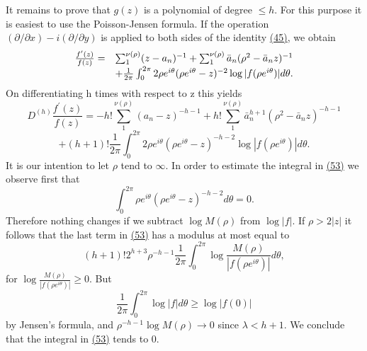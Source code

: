 It remains to prove that $g(z)$ is a polynomial of degree $\leq h$. For this purpose it is easiest to use the Poisson-Jensen formula. If the operation $(\partial/\partial x) - i(\partial/\partial y)$ is applied to both sides of the identity \hyperref[eq:5.45]{(45)}, we obtain
\begin{equation*}
\begin{array}{r l} \frac {f ^ {\prime} (z)}{f (z)} = & \sum_ {1} ^ {\nu (\rho)} (z - a _ {n}) ^ {- 1} + \sum_ {1} ^ {\nu (\rho)} \bar {a} _ {n} (\rho^ {2} - \bar {a} _ {n} z) ^ {- 1} \\ & + \frac {1}{2 \pi} \int_ {0} ^ {2 \pi} 2 \rho e ^ {i \theta} (\rho e ^ {i \theta} - z) ^ {- 2} \log | f (\rho e ^ {i \theta}) | d \theta . \end{array}
\end{equation*}
On differentiating h times with respect to z this yields
\begin{equation*}
D ^ {(h)} \frac {f ^ {\prime} (z)}{f (z)} = - h! \sum_ {1} ^ {\nu (\rho)} (a _ {n} - z) ^ {- h - 1} + h! \sum_ {1} ^ {\nu (\rho)} \bar {a} _ {n} ^ {h + 1} (\rho^ {2} - \bar {a} _ {n} z) ^ {- h - 1}\tag{53}\label{eq:5.53}
\end{equation*}
\begin{equation*}
+ (h + 1)! \frac {1}{2 \pi} \int_ {0} ^ {2 \pi} 2 \rho e ^ {i \theta} (\rho e ^ {i \theta} - z) ^ {- h - 2} \log | f (\rho e ^ {i \theta}) | d \theta .
\end{equation*}
It is our intention to let $\rho$ tend to $\infty$. In order to estimate the integral in \hyperref[eq:5.53]{(53)} we observe first that
\begin{equation*}
\int_ {0} ^ {2 \pi} \rho e ^ {i \theta} (\rho e ^ {i \theta} - z) ^ {- h - 2} d \theta = 0.
\end{equation*}
Therefore nothing changes if we subtract $\log M(\rho)$ from $\log |f|$. If $\rho > 2|z|$ it follows that the last term in \hyperref[eq:5.53]{(53)} has a modulus at most equal to
\begin{equation*}
(h + 1)! 2 ^ {h + 3} \rho^ {- h - 1} \frac {1}{2 \pi} \int_ {0} ^ {2 \pi} \log \frac {M (\rho)}{| f (\rho e ^ {i \theta}) |} d \theta ,
\end{equation*}
for $\log \frac{M(\rho)}{|f(\rho e^{i\theta})|} \geq 0$. But
\begin{equation*}
\frac {1}{2 \pi} \int_ {0} ^ {2 \pi} \log | f | d \theta \geq \log | f (0) |
\end{equation*}
by Jensen's formula, and $\rho^{-h-1} \log M(\rho) \to 0$ since $\lambda < h + 1$. We conclude that the integral in \hyperref[eq:5.53]{(53)} tends to 0.

